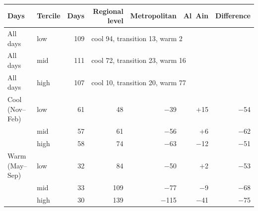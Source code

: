 \begin{tabular}{llrrrrr}
\toprule
Days & Tercile & Days & Regional level & Metropolitan & Al~Ain & Difference \\
\midrule
All days & low & 109 & \multicolumn{4}{l}{cool 94, transition 13, warm 2} \\
All days & mid & 111 & \multicolumn{4}{l}{cool 72, transition 23, warm 16} \\
All days & high & 107 & \multicolumn{4}{l}{cool 10, transition 20, warm 77} \\
\midrule
Cool (Nov--Feb) & low & 61 & 48 & $-$39 & $+$15 & $-$54 \\
 & mid & 57 & 61 & $-$56 & $+$6 & $-$62 \\
 & high & 58 & 74 & $-$63 & $-$12 & $-$51 \\
Warm (May--Sep) & low & 32 & 84 & $-$50 & $+$2 & $-$53 \\
 & mid & 33 & 109 & $-$77 & $-$9 & $-$68 \\
 & high & 30 & 139 & $-$115 & $-$41 & $-$75 \\
\bottomrule
\end{tabular}
